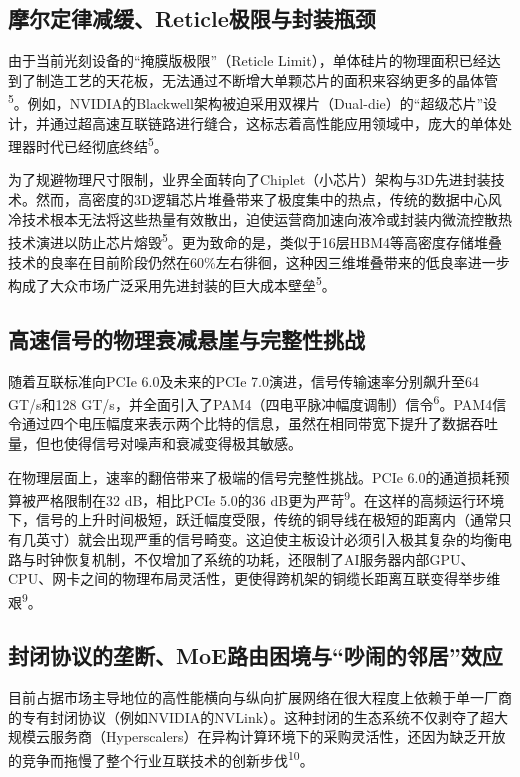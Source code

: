 \subsection{摩尔定律减缓、Reticle极限与封装瓶颈}

由于当前光刻设备的``掩膜版极限''（Reticle Limit），单体硅片的物理面积已经达到了制造工艺的天花板，无法通过不断增大单颗芯片的面积来容纳更多的晶体管\textsuperscript{5}。例如，NVIDIA的Blackwell架构被迫采用双裸片（Dual-die）的``超级芯片''设计，并通过超高速互联链路进行缝合，这标志着高性能应用领域中，庞大的单体处理器时代已经彻底终结\textsuperscript{5}。

为了规避物理尺寸限制，业界全面转向了Chiplet（小芯片）架构与3D先进封装技术。然而，高密度的3D逻辑芯片堆叠带来了极度集中的热点，传统的数据中心风冷技术根本无法将这些热量有效散出，迫使运营商加速向液冷或封装内微流控散热技术演进以防止芯片熔毁\textsuperscript{5}。更为致命的是，类似于16层HBM4等高密度存储堆叠技术的良率在目前阶段仍然在60\%左右徘徊，这种因三维堆叠带来的低良率进一步构成了大众市场广泛采用先进封装的巨大成本壁垒\textsuperscript{5}。

\subsection{高速信号的物理衰减悬崖与完整性挑战}

随着互联标准向PCIe 6.0及未来的PCIe 7.0演进，信号传输速率分别飙升至64 GT/s和128 GT/s，并全面引入了PAM4（四电平脉冲幅度调制）信令\textsuperscript{6}。PAM4信令通过四个电压幅度来表示两个比特的信息，虽然在相同带宽下提升了数据吞吐量，但也使得信号对噪声和衰减变得极其敏感。

在物理层面上，速率的翻倍带来了极端的信号完整性挑战。PCIe 6.0的通道损耗预算被严格限制在32 dB，相比PCIe 5.0的36 dB更为严苛\textsuperscript{9}。在这样的高频运行环境下，信号的上升时间极短，跃迁幅度受限，传统的铜导线在极短的距离内（通常只有几英寸）就会出现严重的信号畸变。这迫使主板设计必须引入极其复杂的均衡电路与时钟恢复机制，不仅增加了系统的功耗，还限制了AI服务器内部GPU、CPU、网卡之间的物理布局灵活性，更使得跨机架的铜缆长距离互联变得举步维艰\textsuperscript{9}。

\subsection{封闭协议的垄断、MoE路由困境与``吵闹的邻居''效应}

目前占据市场主导地位的高性能横向与纵向扩展网络在很大程度上依赖于单一厂商的专有封闭协议（例如NVIDIA的NVLink）。这种封闭的生态系统不仅剥夺了超大规模云服务商（Hyperscalers）在异构计算环境下的采购灵活性，还因为缺乏开放的竞争而拖慢了整个行业互联技术的创新步伐\textsuperscript{10}。

